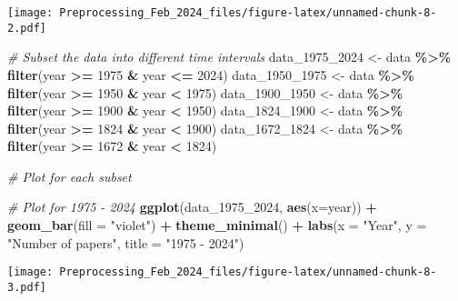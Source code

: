 \documentclass[
]{article}
\newenvironment{Shaded}{\begin{snugshade}}{\end{snugshade}}
\newcommand{\AttributeTok}[1]{\textcolor[rgb]{0.13,0.29,0.53}{#1}}
\newcommand{\CommentTok}[1]{\textcolor[rgb]{0.56,0.35,0.01}{\textit{#1}}}
\newcommand{\DecValTok}[1]{\textcolor[rgb]{0.00,0.00,0.81}{#1}}
\newcommand{\FunctionTok}[1]{\textcolor[rgb]{0.13,0.29,0.53}{\textbf{#1}}}
\newcommand{\NormalTok}[1]{#1}
\newcommand{\OtherTok}[1]{\textcolor[rgb]{0.56,0.35,0.01}{#1}}
\newcommand{\SpecialCharTok}[1]{\textcolor[rgb]{0.81,0.36,0.00}{\textbf{#1}}}
\newcommand{\StringTok}[1]{\textcolor[rgb]{0.31,0.60,0.02}{#1}}
\begin{document}
\texttt{[image: Preprocessing\_Feb\_2024\_files/figure-latex/unnamed-chunk-8-2.pdf]}

\begin{Shaded}
\begin{Highlighting}[]
\CommentTok{\# Subset the data into different time intervals}
\NormalTok{data\_1975\_2024 }\OtherTok{\textless{}{-}}\NormalTok{ data }\SpecialCharTok{\%\textgreater{}\%} \FunctionTok{filter}\NormalTok{(year }\SpecialCharTok{\textgreater{}=} \DecValTok{1975} \SpecialCharTok{\&}\NormalTok{ year }\SpecialCharTok{\textless{}=} \DecValTok{2024}\NormalTok{)}
\NormalTok{data\_1950\_1975 }\OtherTok{\textless{}{-}}\NormalTok{ data }\SpecialCharTok{\%\textgreater{}\%} \FunctionTok{filter}\NormalTok{(year }\SpecialCharTok{\textgreater{}=} \DecValTok{1950} \SpecialCharTok{\&}\NormalTok{ year }\SpecialCharTok{\textless{}} \DecValTok{1975}\NormalTok{)}
\NormalTok{data\_1900\_1950 }\OtherTok{\textless{}{-}}\NormalTok{ data }\SpecialCharTok{\%\textgreater{}\%} \FunctionTok{filter}\NormalTok{(year }\SpecialCharTok{\textgreater{}=} \DecValTok{1900} \SpecialCharTok{\&}\NormalTok{ year }\SpecialCharTok{\textless{}} \DecValTok{1950}\NormalTok{)}
\NormalTok{data\_1824\_1900 }\OtherTok{\textless{}{-}}\NormalTok{ data }\SpecialCharTok{\%\textgreater{}\%} \FunctionTok{filter}\NormalTok{(year }\SpecialCharTok{\textgreater{}=} \DecValTok{1824} \SpecialCharTok{\&}\NormalTok{ year }\SpecialCharTok{\textless{}} \DecValTok{1900}\NormalTok{)}
\NormalTok{data\_1672\_1824 }\OtherTok{\textless{}{-}}\NormalTok{ data }\SpecialCharTok{\%\textgreater{}\%} \FunctionTok{filter}\NormalTok{(year }\SpecialCharTok{\textgreater{}=} \DecValTok{1672} \SpecialCharTok{\&}\NormalTok{ year }\SpecialCharTok{\textless{}} \DecValTok{1824}\NormalTok{)}

\CommentTok{\# Plot for each subset}

\CommentTok{\# Plot for 1975 {-} 2024}
\FunctionTok{ggplot}\NormalTok{(data\_1975\_2024, }\FunctionTok{aes}\NormalTok{(}\AttributeTok{x=}\NormalTok{year)) }\SpecialCharTok{+}
  \FunctionTok{geom\_bar}\NormalTok{(}\AttributeTok{fill =} \StringTok{"violet"}\NormalTok{) }\SpecialCharTok{+}
  \FunctionTok{theme\_minimal}\NormalTok{() }\SpecialCharTok{+}
\FunctionTok{labs}\NormalTok{(}\AttributeTok{x =} \StringTok{"Year"}\NormalTok{, }\AttributeTok{y =} \StringTok{"Number of papers"}\NormalTok{, }\AttributeTok{title =} \StringTok{"1975 {-} 2024"}\NormalTok{)}
\end{Highlighting}
\end{Shaded}

\texttt{[image: Preprocessing\_Feb\_2024\_files/figure-latex/unnamed-chunk-8-3.pdf]}
\end{document}
